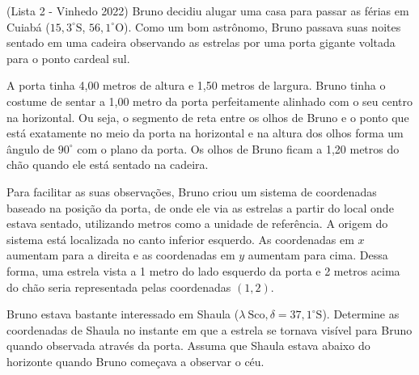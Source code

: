 \documentclass[11pt]{article}
\begin{document}
\begin{pproblem}(Lista 2 - Vinhedo 2022) 
    Bruno decidiu alugar uma casa para passar as férias em Cuiabá ($15,3^{\circ} \text{S}$, $56,1^{\circ} \text{O}$). Como um bom astrônomo, Bruno passava suas noites sentado em uma cadeira observando as estrelas por uma porta gigante voltada para o ponto cardeal sul.

    A porta tinha 4,00 metros de altura e 1,50 metros de largura. Bruno tinha o costume de sentar a
    1,00 metro da porta perfeitamente alinhado com o seu centro na horizontal. Ou seja, o segmento
    de reta entre os olhos de Bruno e o ponto que está exatamente no meio da porta na horizontal e
    na altura dos olhos forma um ângulo de $90^{\circ}$ com o plano da porta. Os olhos de Bruno ficam a
    1,20 metros do chão quando ele está sentado na cadeira.
    
    Para facilitar as suas observações, Bruno criou um sistema de coordenadas baseado na posição da
    porta, de onde ele via as estrelas a partir do local onde estava sentado, utilizando metros como
    a unidade de referência. A origem do sistema está localizada no canto inferior esquerdo. As coordenadas
    em $x$ aumentam para a direita e as coordenadas em $y$ aumentam para cima. Dessa forma, uma
    estrela vista a 1 metro do lado esquerdo da porta e 2 metros acima do chão seria representada
    pelas coordenadas $(1, 2)$.
    
    Bruno estava bastante interessado em Shaula ($\lambda \ \text{Sco}, \delta = 37,1^{\circ} \text{S}$). Determine as coordenadas de
    Shaula no instante em que a estrela se tornava visível para Bruno quando observada através da porta. Assuma que Shaula estava abaixo do horizonte quando Bruno começava a observar o céu.
    
\end{pproblem}
\end{document}
